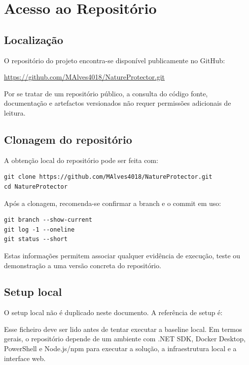 \section{Acesso ao Repositório}

\subsection{Localização}

O repositório do projeto encontra-se disponível publicamente no GitHub:

\begin{center}
\url{https://github.com/MAlves4018/NatureProtector.git}
\end{center}

Por se tratar de um repositório público, a consulta do código fonte, documentação e artefactos versionados não requer permissões adicionais de leitura.

\subsection{Clonagem do repositório}

A obtenção local do repositório pode ser feita com:

\begin{verbatim}
git clone https://github.com/MAlves4018/NatureProtector.git
cd NatureProtector
\end{verbatim}

Após a clonagem, recomenda-se confirmar a branch e o commit em uso:

\begin{verbatim}
git branch --show-current
git log -1 --oneline
git status --short
\end{verbatim}

Estas informações permitem associar qualquer evidência de execução, teste ou demonstração a uma versão concreta do repositório.

\subsection{Setup local}

O setup local não é duplicado neste documento. A referência de setup é:

\begin{center}
\end{center}

Esse ficheiro deve ser lido antes de tentar executar a baseline local. Em termos gerais, o repositório depende de um ambiente com .NET SDK, Docker Desktop, PowerShell e Node.js/npm para executar a solução, a infraestrutura local e a interface web.
